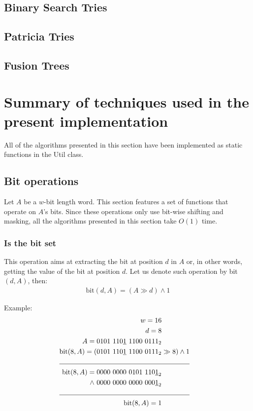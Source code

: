 \subsection{Binary Search Tries}

\subsection{Patricia Tries}

\subsection{Fusion Trees}

\section{Summary of techniques used in the present implementation}

All of the algorithms presented in this section have been implemented as static functions in the {\ttfamily Util} class.

\subsection{Bit operations} \label{sec:bit}

Let $A$ be a $w$-bit length word. This section features a set of functions that operate on $A$'s bits. Since these operations only use bit-wise shifting and masking, all the algorithms presented in this section take $O(1)$ time.

\subsubsection{Is the bit set}

This operation aims at extracting the bit at position $d$ in $A$ or, in other words, getting the value of the bit at position $d$. Let us denote such operation by bit$(d, A)$, then:
\begin{align*}
    \text{bit}(d, A) = (A \gg d) \wedge 1
\end{align*}

Example:
\begin{align*}
    w = 16\\
    d = 8\\
    A = 0101\ 110\underline{1}\ 1100\ 0111_2& \\
    \text{bit}(8,A) = (0101\ 110\underline{1}\ 1100\ 0111_2& \gg 8) \wedge 1 \\
    \cline{1-2}
    \text{bit}(8,A) = 0000\ 0000\ 0101\ 110\underline{1}_2& \\
    \wedge\ 0000\ 0000\ 0000\ 000\underline{1}_2 \\
    \cline{1-2}
    \text{bit}(8,A) = 1 &
\end{align*}

